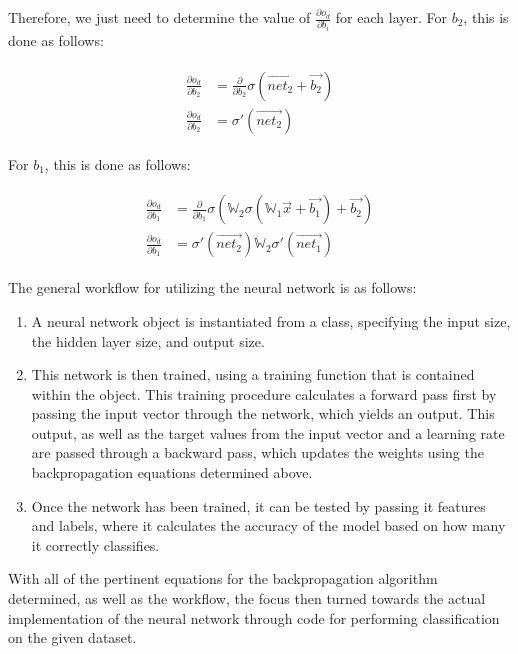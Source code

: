 \documentclass[a4paper]{article}
\begin{document}
Therefore, we just need to determine the value of $\frac{\partial{o_d}}{\partial{b_i}}$ for each layer. For $b_2$, this is done as follows:

\begin{gather}
    \begin{aligned}
        \frac{\partial{o_d}}{\partial{b_2}} &= \frac{\partial}{\partial{b_2}}\sigma(\overrightarrow{net_2} + \overrightarrow{b_2}) \\
        \frac{\partial{o_d}}{\partial{b_2}} &=\sigma'(\overrightarrow{net_2})
    \end{aligned}
\end{gather}

For $b_1$, this is done as follows:

\begin{gather}
    \begin{aligned}
        \frac{\partial{o_d}}{\partial{b_1}} &= \frac{\partial}{\partial{b_1}} \sigma(\mathbb W_2 \sigma(\mathbb W_1 \overrightarrow{x} + \overrightarrow{b_1}) + \overrightarrow{b_2})\\
        \frac{\partial{o_d}}{\partial{b_1}} &= \sigma'(\overrightarrow{net_2})\mathbb W_2 \sigma'(\overrightarrow{net_1})
    \end{aligned}
\end{gather}

The general workflow for utilizing the neural network is as follows:

\begin{enumerate}
    \item A neural network object is instantiated from a class, specifying the input size, the hidden layer size, and output size.
    \item This network is then trained, using a training function that is contained within the object. This training procedure calculates a forward pass first by passing the input vector through the network, which yields an output. This output, as well as the target values from the input vector and a learning rate are passed through a backward pass, which updates the weights using the backpropagation equations determined above.
    \item Once the network has been trained, it can be tested by passing it features and labels, where it calculates the accuracy of the model based on how many it correctly classifies.
\end{enumerate}

With all of the pertinent equations for the backpropagation algorithm determined, as well as the workflow, the focus then turned towards the actual implementation of the neural network through code for performing classification on the given dataset.
\end{document}

